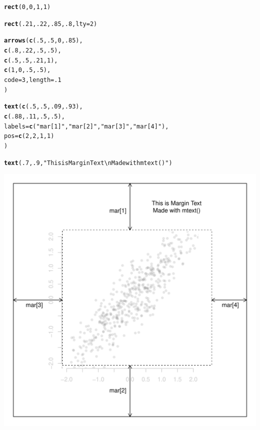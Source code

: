 \documentclass{tufte-book}\usepackage[]{graphicx}\usepackage[]{color}
\makeatletter
\def\maxwidth{ %
  \ifdim\Gin@nat@width>\linewidth
    \linewidth
  \else
    \Gin@nat@width
  \fi
}
\newcommand{\hlnum}[1]{\textcolor[rgb]{0.686,0.059,0.569}{#1}}%
\newcommand{\hlstr}[1]{\textcolor[rgb]{0.192,0.494,0.8}{#1}}%
\newcommand{\hlstd}[1]{\textcolor[rgb]{0.345,0.345,0.345}{#1}}%
\newcommand{\hlkwc}[1]{\textcolor[rgb]{0.333,0.667,0.333}{#1}}%
\newcommand{\hlkwd}[1]{\textcolor[rgb]{0.737,0.353,0.396}{\textbf{#1}}}%
\newenvironment{kframe}{%
 \def\at@end@of@kframe{}%
 \ifinner\ifhmode%
  \def\at@end@of@kframe{\end{minipage}}%
  \begin{minipage}{\columnwidth}%
 \fi\fi%
 \def\FrameCommand##1{\hskip\@totalleftmargin \hskip-\fboxsep
 \colorbox{shadecolor}{##1}\hskip-\fboxsep
     \hskip-\linewidth \hskip-\@totalleftmargin \hskip\columnwidth}%
 \MakeFramed {\advance\hsize-\width
   \@totalleftmargin\z@ \linewidth\hsize
   \@setminipage}}%
 {\par\unskip\endMakeFramed%
 \at@end@of@kframe}
\newenvironment{knitrout}{}{} %
\makeatother
\begin{document}
\begin{footnotesize}
\begin{marginfigure}
\begin{tiny}
\begin{knitrout}
\begin{kframe}
\begin{alltt}
\hlkwd{rect}\hlstd{(}\hlnum{0}\hlstd{,} \hlnum{0}\hlstd{,} \hlnum{1}\hlstd{,} \hlnum{1}\hlstd{)}

\hlkwd{rect}\hlstd{(}\hlnum{.21}\hlstd{,} \hlnum{.22}\hlstd{,} \hlnum{.85}\hlstd{,} \hlnum{.8}\hlstd{,} \hlkwc{lty} \hlstd{=} \hlnum{2}\hlstd{)}

\hlkwd{arrows}\hlstd{(}\hlkwd{c}\hlstd{(}\hlnum{.5}\hlstd{,} \hlnum{.5}\hlstd{,} \hlnum{0}\hlstd{,} \hlnum{.85}\hlstd{),}
       \hlkwd{c}\hlstd{(}\hlnum{.8}\hlstd{,} \hlnum{.22}\hlstd{,} \hlnum{.5}\hlstd{,} \hlnum{.5}\hlstd{),}
       \hlkwd{c}\hlstd{(}\hlnum{.5}\hlstd{,} \hlnum{.5}\hlstd{,} \hlnum{.21}\hlstd{,} \hlnum{1}\hlstd{),}
       \hlkwd{c}\hlstd{(}\hlnum{1}\hlstd{,} \hlnum{0}\hlstd{,} \hlnum{.5}\hlstd{,} \hlnum{.5}\hlstd{),}
       \hlkwc{code} \hlstd{=} \hlnum{3}\hlstd{,} \hlkwc{length} \hlstd{=} \hlnum{.1}
       \hlstd{)}

\hlkwd{text}\hlstd{(}\hlkwd{c}\hlstd{(}\hlnum{.5}\hlstd{,} \hlnum{.5}\hlstd{,} \hlnum{.09}\hlstd{,} \hlnum{.93}\hlstd{),}
     \hlkwd{c}\hlstd{(}\hlnum{.88}\hlstd{,} \hlnum{.11}\hlstd{,} \hlnum{.5}\hlstd{,} \hlnum{.5}\hlstd{),}
     \hlkwc{labels} \hlstd{=} \hlkwd{c}\hlstd{(}\hlstr{"mar[1]"}\hlstd{,} \hlstr{"mar[2]"}\hlstd{,} \hlstr{"mar[3]"}\hlstd{,} \hlstr{"mar[4]"}\hlstd{),}
     \hlkwc{pos} \hlstd{=} \hlkwd{c}\hlstd{(}\hlnum{2}\hlstd{,} \hlnum{2}\hlstd{,} \hlnum{1}\hlstd{,} \hlnum{1}\hlstd{)}
     \hlstd{)}

\hlkwd{text}\hlstd{(}\hlnum{.7}\hlstd{,} \hlnum{.9}\hlstd{,} \hlstr{"This is Margin Text\textbackslash{}nMade with mtext()"}\hlstd{)}
\end{alltt}
\end{kframe}
\includegraphics[width=\maxwidth]{figure/unnamed-chunk-182-1} 


\end{knitrout}
\end{tiny}
\end{marginfigure}
\end{footnotesize}
\end{document}

